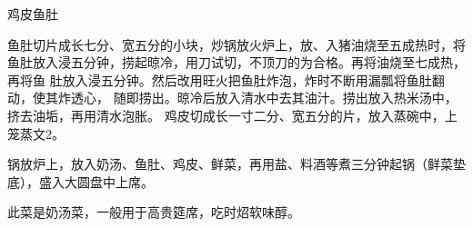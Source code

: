 \begin{recipe}{鸡皮鱼肚}

\ingredients


\cooking

\step 鱼肚切片成长七分、宽五分的小块，炒锅放火炉上，放、入猪油烧至五成热时，将
鱼肚放入浸五分钟，捞起晾冷，用刀试切，不顶刀的为合格。再将油烧至七成热，再将鱼
肚放入浸五分钟。然后改用旺火把鱼肚炸泡，炸时不断用漏瓢将鱼肚翻动，使其炸透心，
随即捞出。晾冷后放入清水中去其油汁。捞出放入热米汤中，挤去油垢，再用清水泡胀。
鸡皮切成长一寸二分、宽五分的片，放入蒸碗中，上笼蒸文2。

\step 锅放炉上，放入奶汤、鱼肚、鸡皮、鲜菜，再用盐、料酒等煮三分钟起锅（鲜菜垫
底），盛入大圆盘中上席。

\features

此菜是奶汤菜，一般用于高贵筵席，吃时炤软味醇。

\end{recipe}

